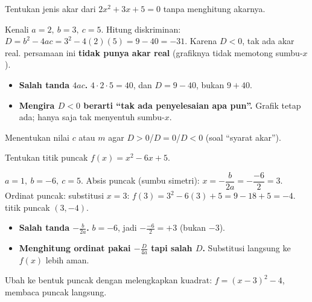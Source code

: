 \begin{soalbox}{}
Tentukan jenis akar dari $2x^2+3x+5=0$ tanpa menghitung akarnya.
\end{soalbox}

\jawab
{} Kenali $a=2,\ b=3,\ c=5$.
 Hitung diskriminan: $D=b^2-4ac=3^2-4(2)(5)=9-40=-31$.
 Karena $D<0$, tak ada akar real.
\jadi persamaan ini \textbf{tidak punya akar real} (grafiknya tidak memotong
sumbu-$x$).

\begin{jebakan}
\begin{itemize}[leftmargin=*,topsep=2pt]
  \item \textbf{Salah tanda $4ac$.} $4\cdot2\cdot5=40$, dan $D=9-40$, bukan
  $9+40$.
  \item \textbf{Mengira $D<0$ berarti ``tak ada penyelesaian apa pun''.} Grafik
  tetap ada; hanya saja tak menyentuh sumbu-$x$.
\end{itemize}
\end{jebakan}

\begin{variasi}
Menentukan nilai $c$ atau $m$ agar $D>0$/$D=0$/$D<0$ (soal ``syarat akar'').
\end{variasi}

\begin{soalbox}{}
Tentukan titik puncak $f(x)=x^2-6x+5$.
\end{soalbox}

\jawab
{} $a=1,\ b=-6,\ c=5$. Absis puncak (sumbu simetri):
$x=-\dfrac{b}{2a}=-\dfrac{-6}{2}=3$.
 Ordinat puncak: substitusi $x=3$:
$f(3)=3^2-6(3)+5=9-18+5=-4$.
\jadi titik puncak $(3,-4)$.

\begin{jebakan}
\begin{itemize}[leftmargin=*,topsep=2pt]
  \item \textbf{Salah tanda $-\frac{b}{2a}$.} $b=-6$, jadi $-\frac{-6}{2}=+3$
  (bukan $-3$).
  \item \textbf{Menghitung ordinat pakai $-\frac{D}{4a}$ tapi salah $D$.}
  Substitusi langsung ke $f(x)$ lebih aman.
\end{itemize}
\end{jebakan}

\begin{variasi}
Ubah ke bentuk puncak dengan melengkapkan kuadrat:
$f=(x-3)^2-4$, membaca puncak langsung.
\end{variasi}

